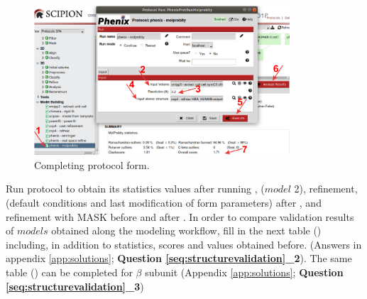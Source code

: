  \begin{figure}[H]
  \centering 
  \captionsetup{width=.7\linewidth} 
  \includegraphics[width=0.85\textwidth]{Images/Fig35}
  \caption{Completing \molprobity protocol form.}
  \label{fig:molprobity_protocol}
  \end{figure}
  
  Run \molprobity protocol to obtain its statistics values after running , \chimera {} ($model$ 2), \coot refinement, \phenix {} (default conditions and last modification of form parameters) after \coot, and  refinement with MASK before and after \phenix {}. In order to compare validation results of $models$ obtained along the modeling workflow, fill in the next table () including, in addition to \molprobity statistics, \emringer scores and \ccmask values obtained before. (Answers in appendix \ref{app:solutions}; \textbf{Question \ref{seq:structurevalidation}\_2}). The same table () can be completed for  $\beta$ subunit (Appendix \ref{app:solutions}; \textbf{Question \ref{seq:structurevalidation}\_3})\\
  
